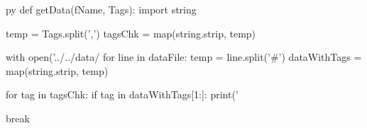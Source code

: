 \begin{pythontexcustomcode}{py}
def getData(fName, Tags):
    import string
    
    temp = Tags.split(',')
    tagsChk = map(string.strip, temp)
    
    with open('../../data/%
        for line in dataFile:
            temp = line.split('#')
            dataWithTags = map(string.strip, temp)
            
            for tag in tagsChk:
                if tag in dataWithTags[1:]:
                    print('\item %
                    break
\end{pythontexcustomcode} 
